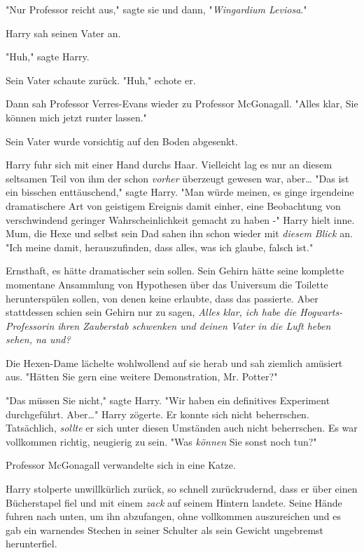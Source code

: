 {"Nur Professor reicht aus," sagte sie und dann, "\emph{Wingardium Leviosa}."

Harry sah seinen Vater an.

"Huh," sagte Harry.

Sein Vater schaute zurück. "Huh," echote er.

Dann sah Professor Verres-Evans wieder zu Professor McGonagall. "Alles klar, Sie können mich jetzt runter lassen."

Sein Vater wurde vorsichtig auf den Boden abgesenkt.

Harry fuhr sich mit einer Hand durchs Haar. Vielleicht lag es nur an diesem seltsamen Teil von ihm der schon \emph{vorher} überzeugt gewesen war, aber… "Das ist ein bisschen enttäuschend," sagte Harry. "Man würde meinen, es ginge irgendeine dramatischere Art von geistigem Ereignis damit einher, eine Beobachtung von verschwindend geringer Wahrscheinlichkeit gemacht zu haben -" Harry hielt inne. Mum, die Hexe und selbst sein Dad sahen ihn schon wieder mit \emph{diesem Blick} an. "Ich meine damit, herauszufinden, dass alles, was ich glaube, falsch ist."

Ernsthaft, es hätte dramatischer sein sollen. Sein Gehirn hätte seine komplette momentane Ansammlung von Hypothesen über das Universum die Toilette herunterspülen sollen, von denen keine erlaubte, dass das passierte. Aber stattdessen schien sein Gehirn nur zu sagen, \emph{Alles klar, ich habe die Hogwarts-Professorin ihren Zauberstab schwenken und deinen Vater in die Luft heben sehen, na und?}

Die Hexen-Dame lächelte wohlwollend auf sie herab und sah ziemlich amüsiert aus. "Hätten Sie gern eine weitere Demonstration, Mr. Potter?"

"Das müssen Sie nicht," sagte Harry. "Wir haben ein definitives Experiment durchgeführt. Aber…" Harry zögerte. Er konnte sich nicht beherrschen. Tatsächlich, \emph{sollte} er sich unter diesen Umständen auch nicht beherrschen. Es war vollkommen richtig, neugierig zu sein. "Was \emph{können} Sie sonst noch tun?"

Professor McGonagall verwandelte sich in eine Katze.

Harry stolperte unwillkürlich zurück, so schnell zurückrudernd, dass er über einen Bücherstapel fiel und mit einem \emph{zack} auf seinem Hintern landete. Seine Hände fuhren nach unten, um ihn abzufangen, ohne vollkommen auszureichen und es gab ein warnendes Stechen in seiner Schulter als sein Gewicht ungebremst herunterfiel.

}
